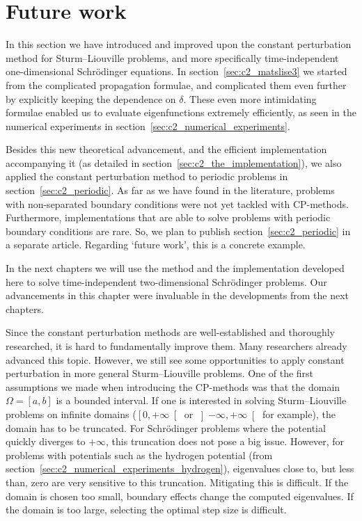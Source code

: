 

\section{Future work}

In this section we have introduced and improved upon the constant perturbation method for Sturm--Liouville problems, and more specifically time-independent one-dimensional Schrödinger equations. In section~\ref{sec:c2_matslise3} we started from the complicated propagation formulae, and complicated them even further by explicitly keeping the dependence on $\delta$. These even more intimidating formulae enabled us to evaluate eigenfunctions extremely efficiently, as seen in the numerical experiments in section~\ref{sec:c2_numerical_experiments}.

Besides this new theoretical advancement, and the efficient implementation accompanying it (as detailed in section~\ref{sec:c2_the_implementation}), we also applied the constant perturbation method to periodic problems in section~\ref{sec:c2_periodic}. As far as we have found in the literature, problems with non-separated boundary conditions were not yet tackled with CP-methods. Furthermore, implementations that are able to solve problems with periodic boundary conditions are rare. So, we plan to publish section~\ref{sec:c2_periodic} in a separate article. Regarding `future work', this is a concrete example.

In the next chapters we will use the method and the implementation developed here to solve time-independent two-dimensional Schrödinger problems. Our advancements in this chapter were invaluable in the developments from the next chapters.

Since the constant perturbation methods are well-established and thoroughly researched, it is hard to fundamentally improve them. Many researchers already advanced this topic. However, we still see some opportunities to apply constant perturbation in more general Sturm--Liouville problems. One of the first assumptions we made when introducing the CP-methods was that the domain $\Omega = [a, b]$ is a bounded interval. If one is interested in solving Sturm--Liouville problems on infinite domains ($\left[0, +\infty\right[$ or $\left]-\infty, +\infty\right[$ for example), the domain has to be truncated. For Schrödinger problems where the potential quickly diverges to $+\infty$, this truncation does not pose a big issue. However, for problems with potentials such as the hydrogen potential (from section~\ref{sec:c2_numerical_experiments_hydrogen}), eigenvalues close to, but less than, zero are very sensitive to this truncation. Mitigating this is difficult. If the domain is chosen too small, boundary effects change the computed eigenvalues. If the domain is too large, selecting the optimal step size is difficult.

